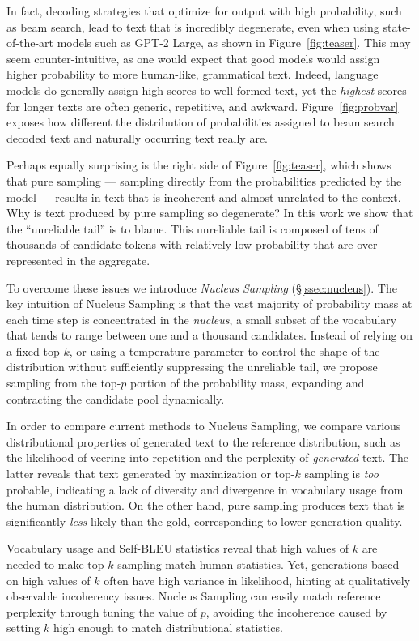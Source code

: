 In fact, decoding strategies that optimize for output with high probability, such as beam search, lead to text that is incredibly degenerate, even when using state-of-the-art models such as GPT-2 Large, as shown in  Figure~\ref{fig:teaser}.
This may seem counter-intuitive, as one would expect that good models would assign higher probability to more human-like, grammatical text. Indeed, language models do generally assign high scores to well-formed text, yet the \textit{highest} scores for longer texts are often generic, repetitive, and awkward. Figure~\ref{fig:probvar} exposes how different the distribution of probabilities assigned to beam search decoded text and naturally occurring text really are. 

Perhaps equally surprising is the right side of Figure~\ref{fig:teaser}, which shows that pure sampling --- sampling directly from the probabilities predicted by the model --- results in text that is incoherent and almost unrelated to the context. Why is text produced by pure sampling so degenerate? In this work we show that the ``unreliable tail'' is to blame. This unreliable tail is composed of tens of thousands of candidate tokens with relatively low probability that are over-represented in the aggregate.

To overcome these issues we introduce \emph{Nucleus Sampling} (\S\ref{ssec:nucleus}).
The key intuition of Nucleus Sampling is that the vast majority of probability mass at each time step is concentrated in the \emph{nucleus}, a small subset of the vocabulary that tends to range between one and a thousand candidates. Instead of relying on a fixed top-$k$, or using a temperature parameter to control the shape of the distribution without sufficiently suppressing the unreliable tail, we propose sampling from the top-$p$ portion of the probability mass, expanding and contracting the candidate pool dynamically.

In order to compare current methods to Nucleus Sampling, we compare various distributional properties of generated text to the reference distribution, such as the likelihood of veering into repetition and the perplexity of \textit{generated} text. The latter reveals that text generated by maximization or top-$k$ sampling is \emph{too} probable, indicating a lack of diversity and divergence in vocabulary usage from the human distribution. On the other hand, pure sampling produces text that is significantly \emph{less} likely than the gold, corresponding to lower generation quality.

Vocabulary usage and Self-BLEU \citep{zhu2018texygen} statistics reveal that high values of $k$ are needed to make top-$k$ sampling match human statistics. Yet, generations based on high values of $k$ often have high variance in likelihood, hinting at qualitatively observable incoherency issues. Nucleus Sampling can easily match reference perplexity through tuning the value of $p$, avoiding the incoherence caused by setting $k$ high enough to match distributional statistics.

